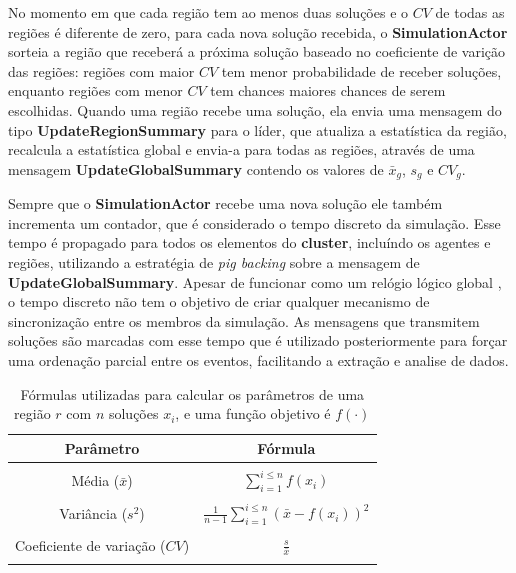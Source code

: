 No momento em que cada região tem ao menos duas soluções e o $CV$ de todas as regiões é diferente de zero, para cada nova solução recebida, o \textbf{SimulationActor} sorteia a região que receberá a próxima solução baseado no coeficiente de varição das regiões: regiões com maior $CV$ tem menor probabilidade de receber soluções, enquanto regiões com menor $CV$ tem chances maiores chances de serem escolhidas. Quando uma região recebe uma solução, ela envia uma mensagem do tipo \textbf{UpdateRegionSummary} para o líder, que atualiza a estatística da região, recalcula a estatística global e envia-a para todas as regiões, através de uma mensagem \textbf{UpdateGlobalSummary} contendo os valores de $\bar{x}_g$, $s_g$ e $CV_g$. 

Sempre que o \textbf{SimulationActor} recebe uma nova solução ele também incrementa um contador, que é considerado o tempo discreto da simulação. Esse tempo é propagado para todos os elementos do \textbf{cluster}, incluíndo os agentes e regiões, utilizando a estratégia de \textit{pig backing} sobre a mensagem de \textbf{UpdateGlobalSummary}. Apesar de funcionar como um relógio lógico global  \cite[p. 244]{tanenbaum}, o tempo discreto não tem o objetivo de criar qualquer mecanismo de sincronização entre os membros da simulação. As mensagens que transmitem soluções são marcadas com esse tempo que é utilizado posteriormente para forçar uma ordenação parcial entre os eventos, facilitando a extração e analise de dados. 

\begin{table}[]
    \centering
    \renewcommand{\arraystretch}{1.5} %
    \caption{Fórmulas utilizadas para calcular os parâmetros de uma região $r$ com $n$ soluções $x_i$, e uma função objetivo é $f(\cdot)$ }
    \label{tab:formulas}
    \begin{tabular}{cc}
        \toprule
         \textbf{Parâmetro} & \textbf{Fórmula} \\
         \midrule
         \\
         Média ($\bar{x}$) & \( \displaystyle \sum_{i = 1}^{i \leq n} f(x_i) \) \\ \\
         Variância ($s^2$) & \( \displaystyle \frac{1}{n - 1} \sum_{i = 1}^{i \leq n} (\bar{x} - f(x_i))^2 \) \\ \\
         Coeficiente de variação ($CV$) & \( \displaystyle \frac{s}{\bar{x}} \) \\ \\
         \bottomrule
    \end{tabular}
\end{table}

